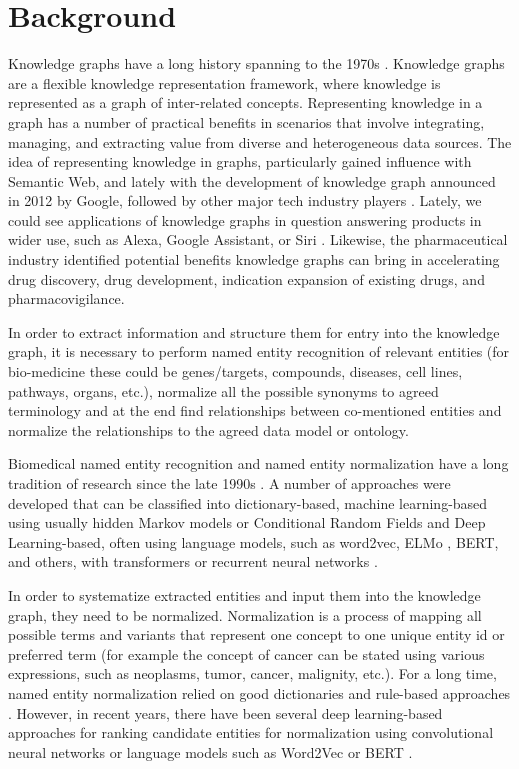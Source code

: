 \documentclass[final,12pt,3p,times,twocolumn,authoryear]{elsarticle}
\begin{document}
\section{Background}

Knowledge graphs have a long history spanning to the 1970s \citep{schneider1973course}. Knowledge graphs are a flexible knowledge representation framework, where knowledge is represented as a graph of inter-related concepts. Representing knowledge in a graph has a number of practical benefits in scenarios that involve integrating, managing, and extracting value from diverse and heterogeneous data sources. The idea of representing knowledge in graphs, particularly gained influence with Semantic Web, and lately with the development of knowledge graph announced in 2012 by Google, followed by other major tech industry players \citep{hogan2021knowledge}. Lately, we could see applications of knowledge graphs in question answering products in wider use, such as Alexa, Google Assistant, or Siri \citep{zhang2018variational}. Likewise, the pharmaceutical industry identified potential benefits knowledge graphs can bring in accelerating drug discovery, drug development, indication expansion of existing drugs, and pharmacovigilance.

In order to extract information and structure them for entry into the knowledge graph, it is necessary to perform named entity recognition of relevant entities (for bio-medicine these could be genes/targets, compounds, diseases, cell lines, pathways, organs, etc.), normalize all the possible synonyms to agreed terminology and at the end find relationships between co-mentioned entities and normalize the relationships to the agreed data model or ontology.
  

Biomedical named entity recognition and named entity normalization have a long tradition of research since the late 1990s \citep{fukuda1998toward,collier2000extracting}. A number of approaches were developed that can be classified into dictionary-based, machine learning-based using usually hidden Markov models or Conditional Random Fields and Deep Learning-based, often using language models, such as word2vec, ELMo \citep{milosevic2020mask}, BERT, and others, with transformers \citep{khan2020mt} or recurrent neural networks \citep{belousov2019extracting}. 

In order to systematize extracted entities and input them into the knowledge graph, they need to be normalized. Normalization is a process of mapping all possible terms and variants that represent one concept to one unique entity id or preferred term (for example the concept of cancer can be stated using various expressions, such as neoplasms, tumor, cancer, malignity, etc.).  For a long time, named entity normalization relied on good dictionaries and rule-based approaches \citep{leaman2015tmchem,cohen2005unsupervised}. However, in recent years, there have been several deep learning-based approaches for ranking candidate entities for normalization using convolutional neural networks \citep{li2017cnn,deng2019ensemble} or language models such as Word2Vec \citep{cho2017method} or BERT \citep{ji2020bert}. 
\end{document}
